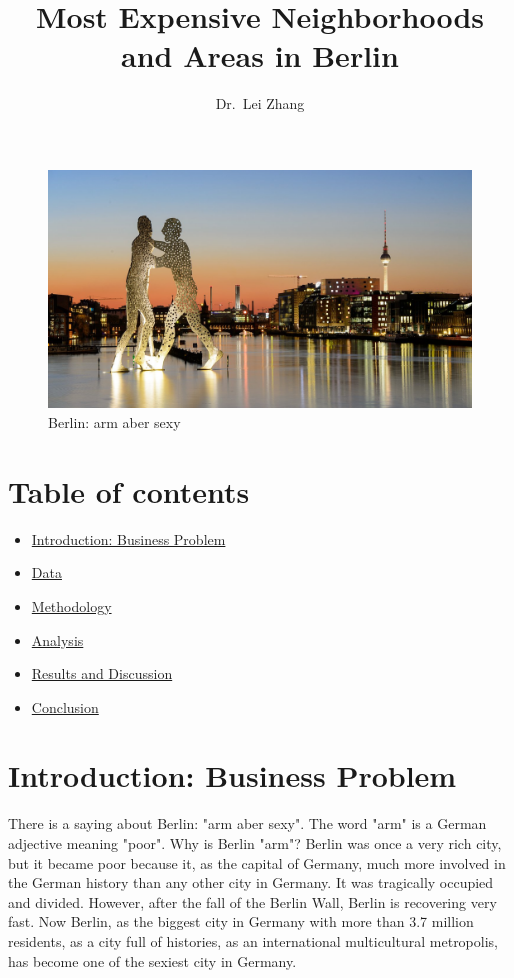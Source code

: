 \documentclass[11pt]{article}
\title{Most Expensive Neighborhoods and Areas in Berlin}
\author{Dr.~Lei Zhang}
\providecommand{\tightlist}{%
      \setlength{\itemsep}{0pt}\setlength{\parskip}{0pt}}
\begin{document}
    
    \maketitle
    



\begin{figure}
\centering
\includegraphics[scale=1.3]{../berlin.jpg}
\caption{Berlin: arm aber sexy}
\end{figure}

    \hypertarget{table-of-contents}{%
\section{Table of contents}\label{table-of-contents}}

\begin{itemize}
\tightlist
\item
  \hyperref[introduction]{Introduction: Business Problem}
\item
  \hyperref[data]{Data}
\item
  \hyperref[methodology]{Methodology}
\item
  \hyperref[analysis]{Analysis}
\item
  \hyperref[results]{Results and Discussion}
\item
  \hyperref[conclusion]{Conclusion}
\end{itemize}

    \hypertarget{introduction-business-problem}{%
\section{\texorpdfstring{Introduction: Business Problem
}{Introduction: Business Problem }}\label{introduction}}


There is a saying about Berlin: "arm aber sexy". The word "arm" is a German adjective
meaning "poor". Why is Berlin "arm"? Berlin was once a very rich city, but
it became poor because it, as the capital of Germany, much more involved in
the German history than any other city in Germany. It was tragically
occupied and divided. However, after the fall of the Berlin Wall, Berlin is 
recovering very fast. Now Berlin,  as the biggest city in Germany with more
than 3.7 million residents, as a city full of histories, as an
international multicultural metropolis, has become one of the sexiest city in Germany.
\end{document}
